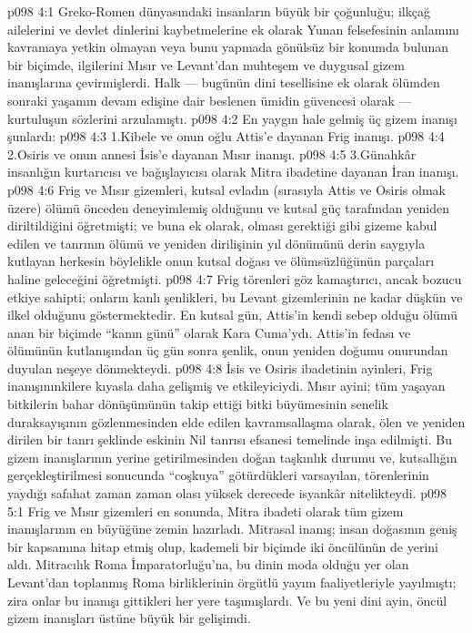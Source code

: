 \vs p098 4:1 Greko\hyp{}Romen dünyasındaki insanların büyük bir çoğunluğu; ilkçağ ailelerini ve devlet dinlerini kaybetmelerine ek olarak Yunan felsefesinin anlamını kavramaya yetkin olmayan veya bunu yapmada gönülsüz bir konumda bulunan bir biçimde, ilgilerini Mısır ve Levant’dan muhteşem ve duygusal gizem inanışlarına çevirmişlerdi. Halk --- bugünün dini tesellisine ek olarak ölümden sonraki yaşamın devam edişine dair beslenen ümidin güvencesi olarak --- kurtuluşun sözlerini arzulamıştı.
\vs p098 4:2 En yaygın hale gelmiş üç gizem inanışı şunlardı:
\vs p098 4:3 1.\bibnobreakspace Kibele ve onun oğlu Attis’e dayanan Frig inanışı.
\vs p098 4:4 2.\bibnobreakspace Osiris ve onun annesi İsis’e dayanan Mısır inanışı.
\vs p098 4:5 3.\bibnobreakspace Günahkâr insanlığın kurtarıcısı ve bağışlayıcısı olarak Mitra ibadetine dayanan İran inanışı.
\vs p098 4:6 Frig ve Mısır gizemleri, kutsal evladın (sırasıyla Attis ve Osiris olmak üzere) ölümü önceden deneyimlemiş olduğunu ve kutsal güç tarafından yeniden diriltildiğini öğretmişti; ve buna ek olarak, olması gerektiği gibi gizeme kabul edilen ve tanrının ölümü ve yeniden dirilişinin yıl dönümünü derin saygıyla kutlayan herkesin böylelikle onun kutsal doğası ve ölümsüzlüğünün parçaları haline geleceğini öğretmişti.
\vs p098 4:7 Frig törenleri göz kamaştırıcı, ancak bozucu etkiye sahipti; onların kanlı şenlikleri, bu Levant gizemlerinin ne kadar düşkün ve ilkel olduğunu göstermektedir. En kutsal gün, Attis’in kendi sebep olduğu ölümü anan bir biçimde “kanın günü” olarak Kara Cuma’ydı. Attis’in fedası ve ölümünün kutlanışından üç gün sonra şenlik, onun yeniden doğumu onurundan duyulan neşeye dönmekteydi.
\vs p098 4:8 İsis ve Osiris ibadetinin ayinleri, Frig inanışınınkilere kıyasla daha gelişmiş ve etkileyiciydi. Mısır ayini; tüm yaşayan bitkilerin bahar dönüşümünün takip ettiği bitki büyümesinin senelik duraksayışının gözlenmesinden elde edilen kavramsallaşma olarak, ölen ve yeniden dirilen bir tanrı şeklinde eskinin Nil tanrısı efsanesi temelinde inşa edilmişti. Bu gizem inanışlarının yerine getirilmesinden doğan taşkınlık durumu ve, kutsallığın gerçekleştirilmesi sonucunda “coşkuya” götürdükleri varsayılan, törenlerinin yaydığı safahat zaman zaman olası yüksek derecede isyankâr nitelikteydi.
\vs p098 5:1 Frig ve Mısır gizemleri en sonunda, Mitra ibadeti olarak tüm gizem inanışlarının en büyüğüne zemin hazırladı. Mitrasal inanış; insan doğasının geniş bir kapsamına hitap etmiş olup, kademeli bir biçimde iki öncülünün de yerini aldı. Mitracılık Roma İmparatorluğu’na, bu dinin moda olduğu yer olan Levant’dan toplanmış Roma birliklerinin örgütlü yayım faaliyetleriyle yayılmıştı; zira onlar bu inanışı gittikleri her yere taşımışlardı. Ve bu yeni dini ayin, öncül gizem inanışları üstüne büyük bir gelişimdi.
